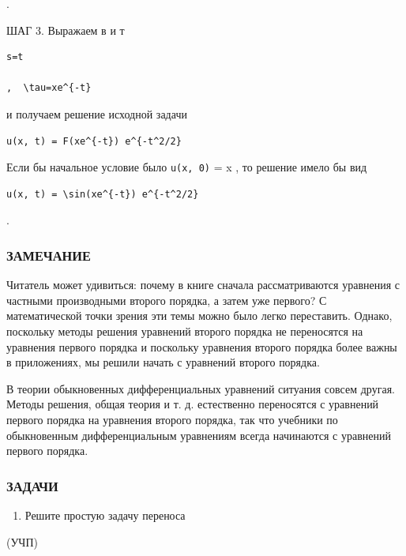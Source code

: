 \documentclass[
  ukrainian,
]{article}
\providecommand{\tightlist}{%
  \setlength{\itemsep}{0pt}\setlength{\parskip}{0pt}}
\begin{document}
.

ШАГ 3. Выражаем в и т

\begin{verbatim}
s=t

,  \tau=xe^{-t}
\end{verbatim}

и получаем решение исходной задачи

\begin{verbatim}
u(x, t) = F(xe^{-t}) e^{-t^2/2}
\end{verbatim}

Если бы начальное условие было \texttt{u(x,\ 0)} = \sin x , то решение
имело бы вид

\begin{verbatim}
u(x, t) = \sin(xe^{-t}) e^{-t^2/2}
\end{verbatim}

.

\subsubsection{ЗАМЕЧАНИЕ}\label{ux437ux430ux43cux435ux447ux430ux43dux438ux435-1}

Читатель может удивиться: почему в книге сначала рассматриваются
уравнения с частными производными второго порядка, а затем уже первого?
С математической точки зрения эти темы можно было легко переставить.
Однако, поскольку методы решения уравнений второго порядка не
переносятся на уравнения первого порядка и поскольку уравнения второго
порядка более важны в приложениях, мы решили начать с уравнений второго
порядка.

В теории обыкновенных дифференциальных уравнений ситуания совсем другая.
Методы решения, общая теория и т. д. естественно переносятся с уравнений
первого порядка на уравнения второго порядка, так что учебники по
обыкновенным дифференциальным уравнениям всегда начинаются с уравнений
первого порядка.

\subsubsection{ЗАДАЧИ}\label{ux437ux430ux434ux430ux447ux438-7}

\begin{enumerate}
\def\labelenumi{\arabic{enumi}.}
\tightlist
\item
  Решите простую задачу переноса
\end{enumerate}

(УЧП)
\end{document}
